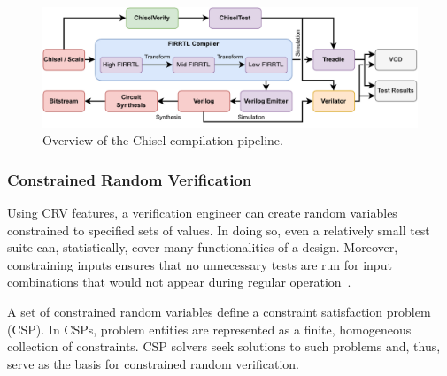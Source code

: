 \documentclass[conference]{IEEEtran}
\begin{document}
\begin{figure}
  \centering
    \includegraphics[width=0.8\linewidth]{Chisel_FIRRTL_VERILOG.pdf}
    \caption{Overview of the Chisel compilation pipeline.}
\label{fig:chisel-pipe}
\end{figure}

\subsubsection{Constrained Random Verification}

Using CRV features, a verification engineer can create random variables constrained to 
specified sets of values. In doing so, even a relatively small test suite can, statistically, 
cover many functionalities of a design. Moreover, constraining inputs ensures that no 
unnecessary tests are run for input combinations that would not appear during regular 
operation~\cite{MehtaCRV2018}.


A set of constrained random variables define a constraint satisfaction problem (CSP). In CSPs, 
problem entities are represented as a finite, homogeneous collection of constraints. CSP solvers 
seek solutions to such problems and, thus, serve as the basis for constrained random verification.

\end{document}

